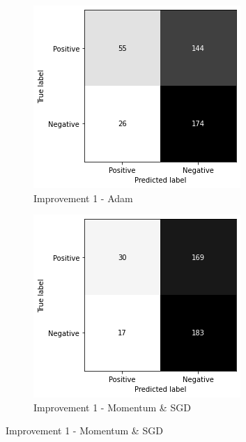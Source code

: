 \begin{figure}
    \centering
    \begin{subfigure}[b]{0.49\textwidth}
        \centering
        \includegraphics[width=\textwidth]{figures/cm-improv-1.png}
        \caption{Improvement 1 - Adam}
        \label{fig:cm-improv-1}
    \end{subfigure}
    \hfill
    \begin{subfigure}[b]{0.49\textwidth}
        \centering
        \includegraphics[width=\textwidth]{figures/cm-improv-1-sgd.png}
        \caption{Improvement 1 - Momentum \& SGD}
        \label{fig:cm-improv-1-sgd}
    \end{subfigure}
    \vspace{10mm} %
    

\end{figure}
